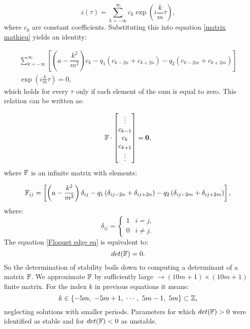 \begin{equation}
	\label{Floquet ansatz}
	z(\tau) = \sum_{k=-\infty}^{\infty} c_k \exp(i\frac{k}{m}\tau),
\end{equation}
where $c_k$ are constant coefficients. Substituting this into equation \eqref{matrix mathieu} yields an identity:

\begin{multline}
	\sum_{k=-\infty}^{\infty}\left[ \left(a - \dfrac{k^2}{m^2} \right)c_k - q_1 \left(c_{k-2n} + c_{k+2n} \right) - q_2 \left(c_{k-2m} + c_{k+2m} \right)  \right] \\ \exp(i\frac{k}{m}\tau) = 0,
\end{multline}
which holds for every $\tau$ only if each element of the sum is equal to zero. This relation can be written as:

\begin{equation}
	\label{Floquet edge eq}
	\mathbb{F} \cdot \begin{bmatrix}
	\vdots \\
	c_{k-1} \\
	c_{k} \\
	c_{k+1} \\
	\vdots
	\end{bmatrix} = \vb{0},
\end{equation}
where $\mathbb{F}$ is an infinite matrix with elements:

\begin{equation}
	\mathbb{F}_{i j} = \left[ \left(a - \dfrac{k^2}{m^2} \right)\delta_{i j} - q_1 \left(\delta_{i j-2n} + \delta_{i j+2n} \right) - q_2 \left(\delta_{i j-2m} + \delta_{i j+2m} \right)  \right],
\end{equation} 
where:
\begin{equation}
	\delta_{ij} = 
	\begin{cases}
		1 & i=j, \\
		0 & i \neq j.
	\end{cases}	
\end{equation}
The equation \eqref{Floquet edge eq} is equivalent to:
\begin{equation}
	\label{Floquet determinant}
	det(\mathbb{F}) = 0.
\end{equation}
So the determination of stability boils down to computing a determinant of a matrix $\mathbb{F}$. We approximate $\mathbb{F}$ by sufficiently large $\rightarrow (10m+1) \times (10m+1)$ finite matrix. For the index $k$ in previous equations it means: $$k \in \{ -5m, \ -5m+1, \  \cdots, \ 5m-1, \ 5m \} \subset \mathbb{Z},$$ neglecting solutions with smaller periods. Parameters for which $det(\mathbb{F}) > 0$ were identified as stable and for $det(\mathbb{F}) < 0$ as unstable.
 	
